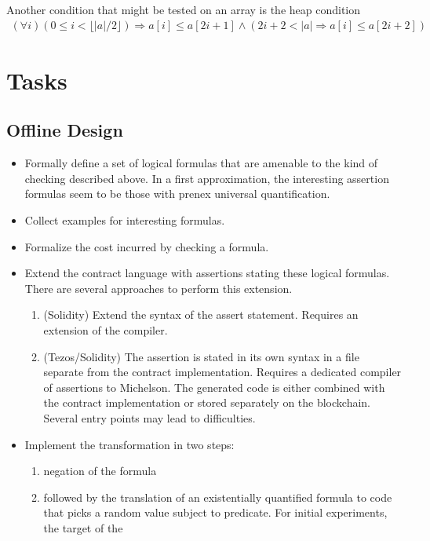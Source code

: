 \documentclass{article}
\begin{document}
Another condition that might be tested on an array is the heap condition
\begin{gather}
  \label{eq:3}
  (\forall i) (0 \le i < \lfloor|a|/2\rfloor) \Rightarrow a[i] \le a[2i+1] \wedge (2i+2
  < |a| \Rightarrow a[i] \le a[2i+2])
\end{gather}


\section{Tasks}
\label{sec:tasks}

\subsection{Offline Design}
\label{sec:offline-design}

\begin{itemize}
\item Formally define a set of logical formulas that are amenable to the kind of checking
  described above. In a first approximation, the interesting assertion formulas seem to
  be those with prenex universal quantification. 
\item Collect examples for interesting formulas.
\item Formalize the cost incurred by checking a formula.
\item Extend the contract language with assertions stating these logical
  formulas. There are several approaches to perform this extension.
  \begin{enumerate}
  \item (Solidity) Extend the syntax of the assert statement. Requires an extension of
    the compiler.
  \item (Tezos/Solidity) The assertion is stated in its own syntax in a file separate from the
    contract implementation. Requires a dedicated compiler of assertions to
    Michelson. The generated code is either combined with the contract implementation
    or stored separately on the blockchain. Several entry points may lead to difficulties.
  \end{enumerate}
\item Implement the transformation in two steps:
  \begin{enumerate}
  \item negation of the formula
  \item followed by the translation of an existentially quantified formula to code that picks a
    random value subject to predicate. For initial experiments, the target of the

\end{enumerate}
\end{itemize}
\end{document}
